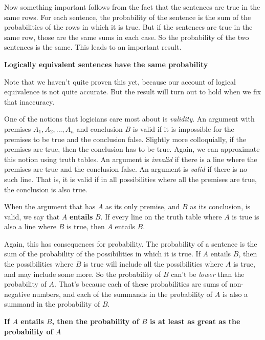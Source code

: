 Now something important follows from the fact that the sentences are true in the same rows. For each sentence, the probability of the sentence is the sum of the probabilities of the rows in which it is true. But if the sentences are true in the same row, those are the same sums in each case. So the probability of the two sentences is the same. This leads to an important result.

\begin{itemize*}
\item \textbf{Logically equivalent sentences have the same probability}
\end{itemize*}

\noindent Note that we haven't quite proven this yet, because our account of logical equivalence is not quite accurate. But the result will turn out to hold when we fix that inaccuracy.

One of the notions that logicians care most about is \textit{validity}. An argument with premises $A_1, A_2, ..., A_n$ and conclusion $B$ is valid if it is impossible for the premises to be true and the conclusion false. Slightly more colloquially, if the premises are true, then the conclusion has to be true. Again, we can approximate this notion using truth tables. An argument is \textit{invalid} if there is a line where the premises are true and the conclusion false. An argument is \textit{valid} if there is no such line. That is, it is valid if in all possibilities where all the premises are true, the conclusion is also true.

When the argument that has $A$ as its only premise, and $B$ as its conclusion, is valid, we say that $A$ \textbf{entails} $B$. If every line on the truth table where $A$ is true is also a line where $B$ is true, then $A$ entails $B$.

Again, this has consequences for probability. The probability of a sentence is the sum of the probability of the possibilities in which it is true. If $A$ entails $B$, then the possibilities where $B$ is true will include all the possibilities where $A$ is true, and may include some more. So the probability of $B$ can't be \textit{lower} than the probability of $A$. That's because each of these probabilities are sums of non-negative numbers, and each of the summands in the probability of $A$ is also a summand in the probability of $B$.

\begin{itemize*}
\item \textbf{If $A$ entails $B$, then the probability of $B$ is at least as great as the probability of $A$}
\end{itemize*}

